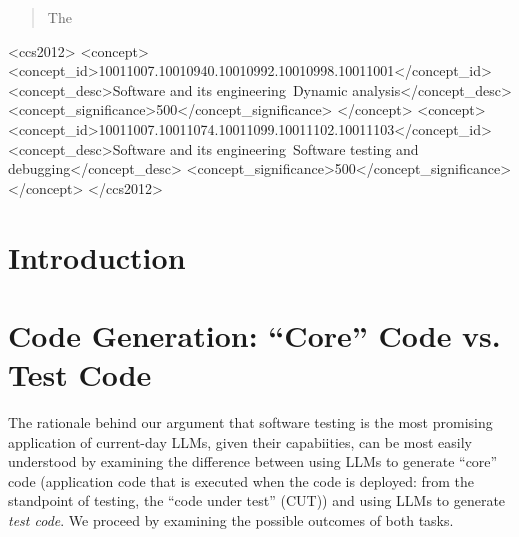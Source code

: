 \documentclass[sigconf,natbib=false]{acmart}
\begin{document}
\begin{abstract}
The 
\end{abstract}

\begin{CCSXML}
<ccs2012>
<concept>
<concept_id>10011007.10010940.10010992.10010998.10011001</concept_id>
<concept_desc>Software and its engineering~Dynamic analysis</concept_desc>
<concept_significance>500</concept_significance>
</concept>
<concept>
<concept_id>10011007.10011074.10011099.10011102.10011103</concept_id>
<concept_desc>Software and its engineering~Software testing and debugging</concept_desc>
<concept_significance>500</concept_significance>
</concept>
</ccs2012>
\end{CCSXML}



\maketitle

\section{Introduction}


\section{Code Generation: ``Core'' Code vs. Test Code}

The rationale behind our argument that software testing is the most
promising application of current-day LLMs, given their capabiities,
can be most easily understood by examining the difference between
using LLMs to generate ``core'' code (application code that is
executed when the code is deployed:  from the standpoint of testing,
the ``code under test'' (CUT)) and using LLMs to
generate \emph{test code}.  We proceed by examining the possible outcomes of
both tasks.
\end{document}
